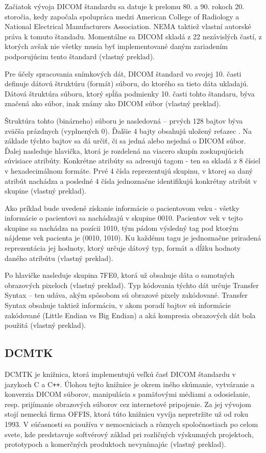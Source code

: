 Začiatok vývoja DICOM štandardu sa datuje k prelomu 80. a 90. rokoch 20. storočia, kedy započala spolupráca medzi American College of Radiology a National Electrical Manufacturers Association. NEMA taktiež vlastní autorské práva k tomuto štandadu. Momentálne sa DICOM skladá z 22 nezávislých častí, z ktorých avšak nie všetky musia byť implementované daným zariadením podporujúcim tento štandard \cite{dicom_history} (vlastný preklad).

Pre účely spracovania snímkových dát, DICOM štandard vo svojej 10. časti definuje dátovú štruktúru (formát) súboru, do ktorého sa tieto dáta ukladajú. Dátová štruktúra súboru, ktorý spĺňa podmienky 10. časti tohto štandaru, býva značená ako  súbor, inak známy ako DICOM súbor \cite{Varma_2012} (vlastný preklad).

Štruktúra tohto (binárneho) súboru je nasledovná -- prvých 128 bajtov býva zväčša prázdnych (vyplnených 0). Ďalšie 4 bajty obsahujú uložený reťazec .  Na základe týchto bajtov sa dá určiť, či sa jedná alebo nejedná o DICOM súbor.
Ďalej nasleduje hlavička, ktorá je rozdelená na viacero skupín zoskupujúcich súvisiace atribúty. Konkrétne atribúty sa adresujú tagom - ten sa skladá z 8 čísiel v hexadecimálnom formáte. Prvé 4 čísla reprezentujú skupinu, v ktorej sa daný atribút nachádza a posledné 4 čísla jednoznačne identifikujú konkrétny atribút v skupine \cite{Varma_2012} (vlastný preklad).

Ako príklad bude uvedené získanie informácie o pacientovom veku - všetky informácie o pacientovi sa nachádzajú v skupine 0010. Pacientov vek v tejto skupine sa nachádza na pozícii 1010, tým pádom výsledný tag pod ktorým nájdeme vek pacienta je (0010, 1010). Ku každému tagu je jednoznačne priradená reprezentácia jej hodnoty, ktorý určuje dátový typ, formát a dĺžku hodnoty daného atribútu  \cite{Varma_2012} (vlastný preklad).

Po hlavičke nasleduje skupina 7FE0, ktorá už obsahuje dáta o samotných obrazových pixeloch \cite{Varma_2012} (vlastný preklad). Typ kódovania týchto dát určuje Transfer Syntax -- ten udáva, akým spôsobom sú obrazové pixely zakódované. Transfer Syntax obsahuje taktiež informáciu, v akom poradí bajtov sú informácie zakódované (Little Endian vs Big Endian) a aká kompresia obrazových dát bola použitá \cite{dicom_transfer_syntax} (vlastný preklad).

\subsection {DCMTK}\label{dcmtk}
DCMTK je knižnica, ktorá implementujú veľkú časť DICOM štandardu v jazykoch C a C\texttt{++}. Úlohou tejto knižnice je okrem iného skúmanie, vytváranie a konverzia DICOM súborov, manipulácia s pamäťovými médiami a odosielanie, resp. prijímanie obrazových súborov cez internetové pripojenie. Za jej vývojom stojí nemecká firma OFFIS, ktorá túto knižnicu vyvíja nepretržite už od roku 1993. V súčasnosti sa používa v nemocniciach a rôznych spoločnostiach po celom svete, kde predstavuje softvérový základ pri rozličných výskumných projektoch, prototypoch a komerčných produktoch nevynímajúc \cite{dcmtk_description} (vlastný preklad). \newline

